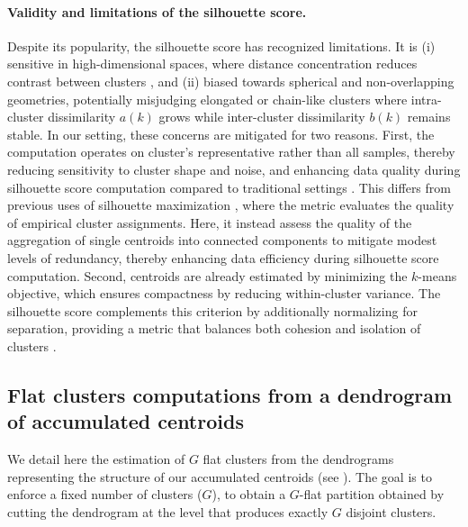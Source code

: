         \paragraph{Validity and limitations of the silhouette score.\\} 
        
        Despite its popularity, the silhouette score has recognized limitations. It is (i) sensitive in high-dimensional spaces, where distance concentration reduces contrast between clusters \cite{Aggarwal2001}, and (ii) biased towards spherical and non-overlapping geometries, potentially misjudging elongated or chain-like clusters where intra-cluster dissimilarity $a(k)$ grows while inter-cluster dissimilarity $b(k)$ remains stable. In our setting, these concerns are mitigated for two reasons. First, the computation operates on cluster's representative rather than all samples, thereby reducing sensitivity to cluster shape and noise, and  enhancing data quality during silhouette score computation compared to traditional settings \cite{Batool2021, Hennig2015, deAPMarques2022}. This differs from previous uses of silhouette maximization \cite{Batool2021, Hennig2015, deAPMarques2022}, where the metric evaluates the quality of empirical cluster assignments. Here, it instead assess the quality of the aggregation of single centroids into connected components to mitigate modest levels of redundancy, thereby enhancing data efficiency during silhouette score computation. 
        Second, centroids are already estimated by minimizing the $k$-means objective, which ensures compactness by reducing within-cluster variance. The silhouette score complements this criterion by additionally normalizing for separation, providing a metric that balances both cohesion and isolation of clusters \cite{Batool2021, Shutaywi2021}.



    \subsection{Flat clusters computations from a dendrogram of accumulated centroids}
    \label{apd:chapter_5_flattening}




    We detail here the estimation of $G$ flat clusters from the dendrograms representing the structure of our accumulated centroids (see ).
    The goal is to enforce a fixed number of clusters (\(G\)), to obtain a $G$-flat partition obtained by cutting the dendrogram at the level that produces exactly \(G\) disjoint clusters.    
     
